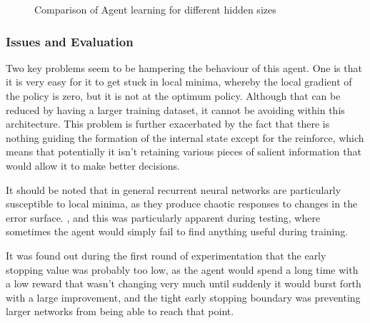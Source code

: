 %
%
%

\begin{figure}
\centering

\caption{Comparison of Agent learning for different hidden sizes}
\label{fig:exp1rfo}
\end{figure}

\subsubsection{Issues and Evaluation} %


Two key problems seem to be hampering the behaviour of this agent. One is that it is very easy for it to get stuck in local minima, whereby the local gradient of the policy is zero, but it is not at the optimum policy. Although that can be reduced by having a larger training dataset, it cannot be avoiding within this architecture. This problem is further exacerbated by the fact that there is nothing guiding the formation of the internal state except for the reinforce, which means that potentially it isn't retaining various pieces of salient information that would allow it to make better decisions.

It should be noted that in general recurrent neural networks are particularly susceptible to local minima, as they produce chaotic responses to changes in the error surface. \cite{Cuéllar2006}, and this was particularly apparent during testing, where sometimes the agent would simply fail to find anything useful during training. %

It was found out during the first round of experimentation that the early stopping value was probably too low, as the agent would spend a long time with a low reward that wasn't changing very much until suddenly it would burst forth with a large improvement, and the tight early stopping boundary was preventing larger networks from being able to reach that point.

